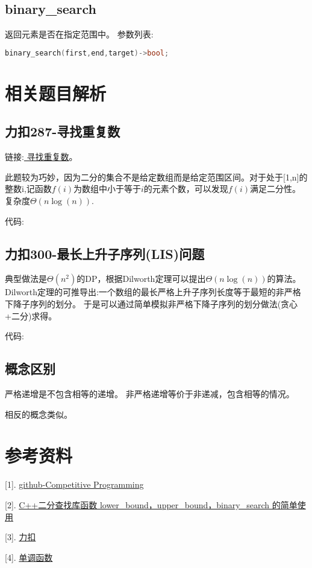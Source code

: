\documentclass{article}
\begin{document}
    \subsection{binary\_search}
    返回元素是否在指定范围中。
    参数列表:
    \begin{lstlisting}[language=c++]
        binary_search(first,end,target)->bool;
    \end{lstlisting}

    \section{相关题目解析}
    \subsection{力扣287-寻找重复数}
    链接:\href{https://leetcode.cn/problems/find-the-duplicate-number/}{ 寻找重复数}。

    此题较为巧妙，因为二分的集合不是给定数组而是给定范围区间。对于处于[1,n]的整数i,记函数$f(i)$为数组中小于等于$i$的元素个数，可以发现$f(i)$满足二分性。复杂度$\Theta(n\log(n))$.

    代码:

    

    \subsection{力扣300-最长上升子序列(LIS)问题}
    典型做法是$\Theta(n^2)$的DP，根据Dilworth定理可以提出$\Theta(n\log(n))$的算法。
    Dilworth定理的可推导出:一个数组的最长严格上升子序列长度等于最短的非严格下降子序列的划分。
    于是可以通过简单模拟非严格下降子序列的划分做法(贪心+二分)求得。

    代码:
    
    

    \subsection{概念区别}
    严格递增是不包含相等的递增。
    非严格递增等价于非递减，包含相等的情况。
    
    相反的概念类似。

    \section*{参考资料}

    [1]. \href{https://github.com/JatinDholakia/Competitive-Programming}{github-Competitive Programming}

    [2]. \href{https://blog.csdn.net/weixin_44176696/article/details/104200660}{C++二分查找库函数 lower\_bound，upper\_bound，binary\_search 的简单使用}

    [3]. \href{https://leetcode.cn/}{力扣}

    [4]. \href{https://www.wikiwand.com/zh-sg/%E5%8D%95%E8%B0%83%E5%87%BD%E6%95%B0}{单调函数}
\end{document}
